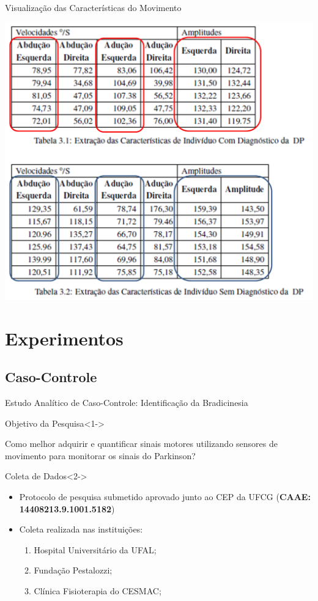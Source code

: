 \documentclass{beamer}
\begin{document}


\begin{frame}{Visualização das Características do Movimento}
  \begin{block}{}
      \center \includegraphics[height=2.6 in]{img/caracteristicas-tabela.png}
  \end{block}
\end{frame}

\section{Experimentos}
\subsection{Caso-Controle}
\begin{frame}{Estudo Analítico de Caso-Controle: Identificação da Bradicinesia} 
    \begin{block}{Objetivo da Pesquisa}<1->

    
    Como melhor adquirir e quantificar sinais motores utilizando sensores de movimento para monitorar os sinais do Parkinson?

    \end{block}
		\begin{block}{Coleta de Dados}<2->
			\begin{itemize}
				\item Protocolo de pesquisa submetido aprovado junto ao CEP da UFCG (\textbf{CAAE: 14408213.9.1001.5182})
				\item Coleta realizada nas instituições:
					\begin{enumerate}
						\item Hospital Universitário da UFAL;
						\item Fundação Pestalozzi;
						\item Clínica Fisioterapia do CESMAC;
				\end{enumerate}				
			\end{itemize}
    \end{block}
\end{frame}
\end{document}
